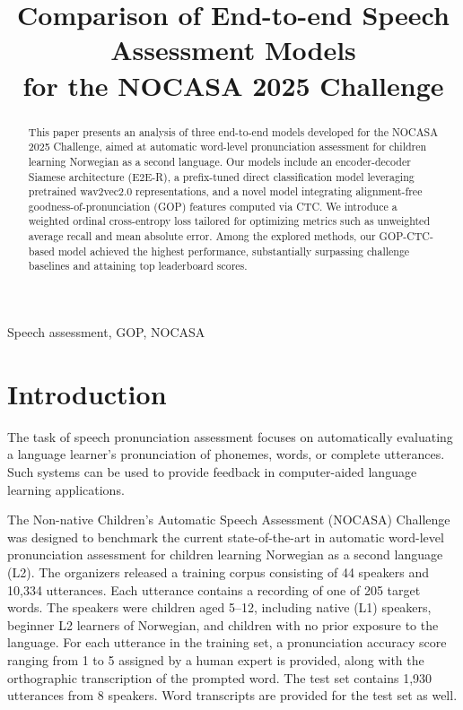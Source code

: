 \documentclass{article}
\title{Comparison of End-to-end Speech Assessment Models\\for the NOCASA 2025 Challenge}
\begin{document}

\maketitle

\begin{abstract}
This paper presents an analysis of three end-to-end models developed for the NOCASA 2025 Challenge, aimed at automatic word-level pronunciation assessment for children learning Norwegian as a second language. Our models include an encoder-decoder Siamese architecture (E2E-R), a prefix-tuned direct classification model leveraging pretrained wav2vec2.0 representations, and a novel model integrating alignment-free goodness-of-pronunciation (GOP) features computed via CTC. We introduce a weighted ordinal cross-entropy loss tailored for optimizing metrics such as unweighted average recall and mean absolute error. Among the explored methods, our GOP-CTC-based model achieved the highest performance, substantially surpassing challenge baselines and attaining top leaderboard scores. 
\end{abstract}
%
\begin{keywords}
Speech assessment, GOP, NOCASA
\end{keywords}

%
\section{Introduction}
\label{sec:intro}

The task of speech pronunciation assessment focuses on automatically evaluating a language learner's pronunciation of phonemes, words, or complete utterances. Such systems can be used to provide feedback in computer-aided language learning  applications.

The Non-native Children’s Automatic Speech Assessment (NOCASA) Challenge \cite{getman2025non} was designed to benchmark the current state-of-the-art in automatic word-level pronunciation assessment for children learning Norwegian as a second language (L2).
The organizers released a training corpus consisting of 44 speakers and 10,334 utterances. Each utterance contains a recording of one of 205 target words. The speakers were children aged 5–12, including native (L1) speakers, beginner L2 learners of Norwegian, and children with no prior exposure to the language. For each utterance in the training set, a pronunciation accuracy score ranging from 1 to 5 assigned by a human expert is provided, along with the orthographic transcription of the prompted word. The test set contains 1,930 utterances from 8 speakers. Word transcripts are provided for the test set as well.
\end{document}
